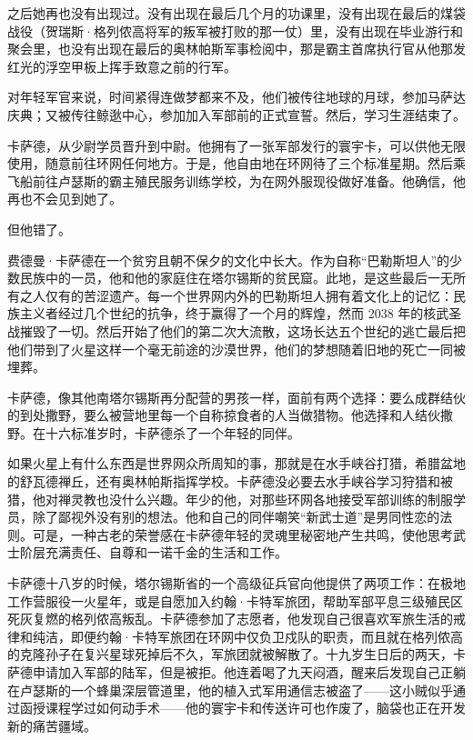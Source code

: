 \documentclass[AutoFakeBold=true]{book}
\begin{document}
之后她再也没有出现过。没有出现在最后几个月的功课里，没有出现在最后的煤袋战役（贺瑞斯·格列侬高将军的叛军被打败的那一仗）里，没有出现在毕业游行和聚会里，也没有出现在最后的奥林帕斯军事检阅中，那是霸主首席执行官从他那发红光的浮空甲板上挥手致意之前的行军。

对年轻军官来说，时间紧得连做梦都来不及，他们被传往地球的月球，参加马萨达庆典；又被传往鲸逖中心，参加加入军部前的正式宣誓。然后，学习生涯结束了。

卡萨德，从少尉学员晋升到中尉。他拥有了一张军部发行的寰宇卡，可以供他无限使用，随意前往环网任何地方。于是，他自由地在环网待了三个标准星期。然后乘飞船前往卢瑟斯的霸主殖民服务训练学校，为在网外服现役做好准备。他确信，他再也不会见到她了。

但他错了。

\vspace*{1em}

费德曼·卡萨德在一个贫穷且朝不保夕的文化中长大。作为自称``巴勒斯坦人''的少数民族中的一员，他和他的家庭住在塔尔锡斯的贫民窟。此地，是这些最后一无所有之人仅有的苦涩遗产。每一个世界网内外的巴勒斯坦人拥有着文化上的记忆：民族主义者经过几个世纪的抗争，终于赢得了一个月的辉煌，然而 2038 年的核武圣战摧毁了一切。然后开始了他们的第二次大流散，这场长达五个世纪的逃亡最后把他们带到了火星这样一个毫无前途的沙漠世界，他们的梦想随着旧地的死亡一同被埋葬。

卡萨德，像其他南塔尔锡斯再分配营的男孩一样，面前有两个选择：要么成群结伙的到处撒野，要么被营地里每一个自称掠食者的人当做猎物。他选择和人结伙撒野。在十六标准岁时，卡萨德杀了一个年轻的同伴。

如果火星上有什么东西是世界网众所周知的事，那就是在水手峡谷打猎，希腊盆地的舒瓦德禅丘，还有奥林帕斯指挥学校。卡萨德没必要去水手峡谷学习狩猎和被猎，他对禅灵教也没什么兴趣。年少的他，对那些环网各地接受军部训练的制服学员，除了鄙视外没有别的想法。他和自己的同伴嘲笑``新武士道''是男同性恋的法则。可是，一种古老的荣誉感在卡萨德年轻的灵魂里秘密地产生共鸣，使他思考武士阶层充满责任、自尊和一诺千金的生活和工作。

卡萨德十八岁的时候，塔尔锡斯省的一个高级征兵官向他提供了两项工作：在极地工作营服役一火星年，或是自愿加入约翰·卡特军旅团，帮助军部平息三级殖民区死灰复燃的格列侬高叛乱。卡萨德参加了志愿者，他发现自己很喜欢军旅生活的戒律和纯洁，即便约翰·卡特军旅团在环网中仅负卫戍队的职责，而且就在格列侬高的克隆孙子在复兴星球死掉后不久，军旅团就被解散了。十九岁生日后的两天，卡萨德申请加入军部的陆军，但是被拒。他连着喝了九天闷酒，醒来后发现自己正躺在卢瑟斯的一个蜂巢深层管道里，他的植入式军用通信志被盗了——这小贼似乎通过函授课程学过如何动手术——他的寰宇卡和传送许可也作废了，脑袋也正在开发新的痛苦疆域。
\end{document}
